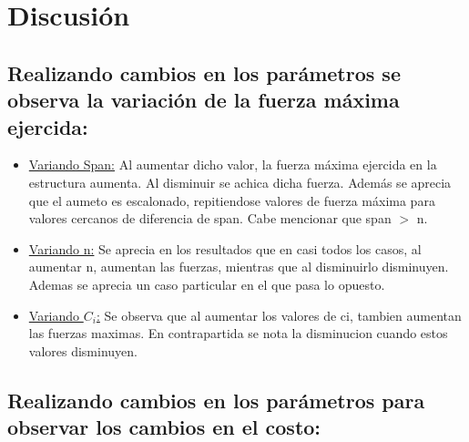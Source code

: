 \section{Discusi\'on}

\subsection{ Realizando cambios en los par\'ametros se observa la variaci\'on de la fuerza m\'axima ejercida:}
\begin{itemize}
\item \underline{Variando Span:} Al aumentar dicho valor, la fuerza m\'axima ejercida en la estructura aumenta. Al disminuir se achica dicha fuerza.\newline
Adem\'as se aprecia que el aumeto es escalonado, repitiendose valores de fuerza m\'axima para valores cercanos de diferencia de span. Cabe mencionar que span $>$ n.

\item \underline{Variando n:} Se aprecia en los resultados que en casi todos los casos, al aumentar n, aumentan las fuerzas, mientras que al disminuirlo disminuyen.\newline
Ademas se aprecia un caso particular en el que pasa lo opuesto. \newline

\item \underline{Variando $C_i$:} Se observa que al aumentar los valores de ci, tambien aumentan las fuerzas maximas. En contrapartida se nota la disminucion cuando estos valores disminuyen.

\end{itemize}
\subsection{Realizando cambios en los par\'ametros para observar los cambios en el costo:}


